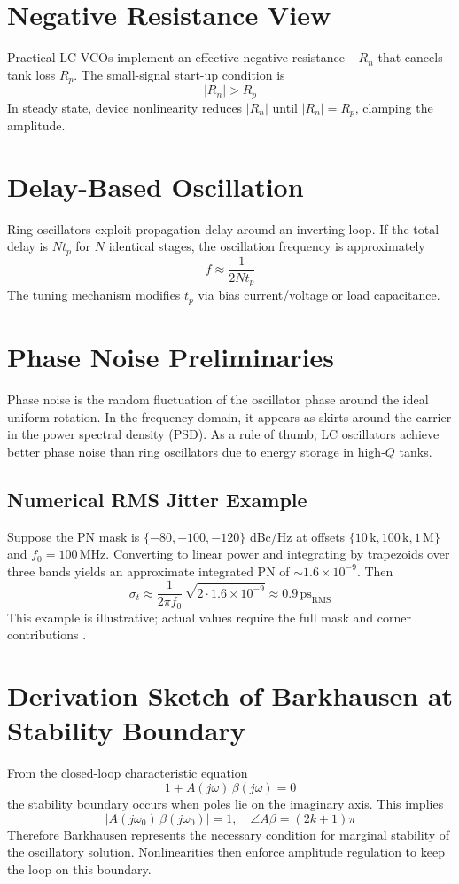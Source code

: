 \section{Negative Resistance View}
Practical LC VCOs implement an effective negative resistance \(-R_n\) that cancels tank loss \(R_p\). The small-signal start-up condition is
\[
|R_n| > R_p
\]
In steady state, device nonlinearity reduces \(|R_n|\) until \(|R_n| = R_p\), clamping the amplitude.

\section{Delay-Based Oscillation}
Ring oscillators exploit propagation delay around an inverting loop. If the total delay is \(N t_p\) for \(N\) identical stages, the oscillation frequency is approximately
\[
f \approx \frac{1}{2 N t_p}
\]
The tuning mechanism modifies \(t_p\) via bias current/voltage or load capacitance.

\section{Phase Noise Preliminaries}
Phase noise is the random fluctuation of the oscillator phase around the ideal uniform rotation. In the frequency domain, it appears as skirts around the carrier in the power spectral density (PSD). As a rule of thumb, LC oscillators achieve better phase noise than ring oscillators due to energy storage in high-\(Q\) tanks.

\subsection*{Numerical RMS Jitter Example}
Suppose the PN mask is $\{-80,-100,-120\}$ dBc/Hz at offsets $\{10\,\text{k}, 100\,\text{k}, 1\,\text{M}\}$ and $f_0=100\,\text{MHz}$. Converting to linear power and integrating by trapezoids over three bands yields an approximate integrated PN of $\sim 1.6\times10^{-9}$. Then
\[
 \sigma_t \approx \frac{1}{2\pi f_0}\,\sqrt{2\cdot 1.6\times10^{-9}} \approx 0.9\,\text{ps}_{\text{RMS}}
\]
This example is illustrative; actual values require the full mask and corner contributions \cite{hajimiri1998,demir2000}.

\section{Derivation Sketch of Barkhausen at Stability Boundary}
From the closed-loop characteristic equation
\[
1 + A(j\omega)\,\beta(j\omega) = 0
\]
the stability boundary occurs when poles lie on the imaginary axis. This implies
\[
|A(j\omega_0)\,\beta(j\omega_0)| = 1,\quad \angle A\beta = (2k+1)\pi
\]
Therefore Barkhausen represents the necessary condition for marginal stability of the oscillatory solution. Nonlinearities then enforce amplitude regulation to keep the loop on this boundary.


